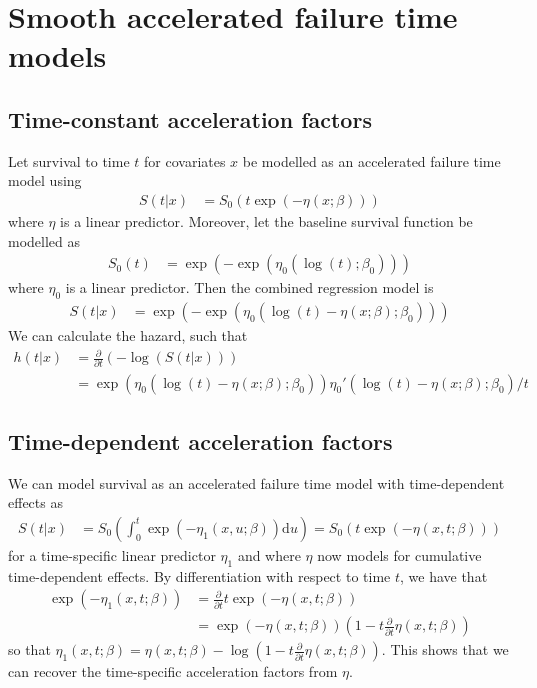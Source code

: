\documentclass{article}
\begin{document}
\section{Smooth accelerated failure time models}

\subsection{Time-constant acceleration factors}

Let survival to time $t$ for covariates $x$ be modelled as an accelerated failure time model using
\begin{align*}
  S(t|x) &= S_0(t \exp(-\eta(x;\beta)))
\end{align*}
where $\eta$ is a linear predictor. Moreover, let the baseline survival function be modelled as
\begin{align*}
  S_0(t) &= \exp(-\exp(\eta_0(\log(t);\beta_0)))
\end{align*}
where $\eta_0$ is a linear predictor. Then the combined regression model is
\begin{align*}
  S(t|x) &= \exp(-\exp(\eta_0(\log(t) -\eta(x; \beta);\beta_0))) 
\end{align*}
We can calculate the hazard, such that
\begin{align*}
  h(t|x) &= \frac{\partial}{\partial t} \left(-\log(S(t|x))\right) \\
         &= \exp(\eta_0(\log(t) -\eta(x; \beta);\beta_0)) \eta_0'(\log(t) -\eta(x; \beta);\beta_0)/t
\end{align*}

\subsection{Time-dependent acceleration factors}

We can model survival as an accelerated failure time model with time-dependent effects as
\begin{align*}
  S(t|x) &= S_0\left(\int_0^t\exp(-\eta_1(x,u;\beta)) \mathrm{d}u\right) = S_0\left(t\exp(-\eta(x,t;\beta))\right)
\end{align*}
for a time-specific linear predictor $\eta_1$ and where $\eta$ now models for cumulative time-dependent effects.
By differentiation with respect to time $t$, we have that
\begin{align*}
  \exp(-\eta_1(x,t;\beta)) &= \frac{\partial}{\partial t} t\exp(-\eta(x,t;\beta)) \\
                            &= \exp(-\eta(x,t;\beta)) \left(1- t \frac{\partial}{\partial t} \eta(x,t;\beta)\right)
\end{align*}
so that $\eta_1(x,t;\beta)=\eta(x,t;\beta) - \log\left(1- t \frac{\partial}{\partial t} \eta(x,t;\beta)\right)$. This shows that we can recover the time-specific acceleration factors from $\eta$.
\end{document}
